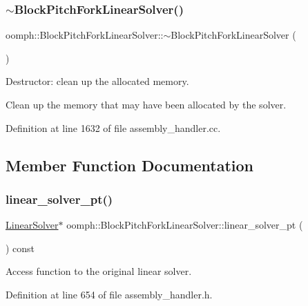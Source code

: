 \subsubsection{\texorpdfstring{$\sim$\+Block\+Pitch\+Fork\+Linear\+Solver()}{~BlockPitchForkLinearSolver()}}
{\footnotesize\ttfamily oomph\+::\+Block\+Pitch\+Fork\+Linear\+Solver\+::$\sim$\+Block\+Pitch\+Fork\+Linear\+Solver (\begin{DoxyParamCaption}{ }\end{DoxyParamCaption})}



Destructor\+: clean up the allocated memory. 

Clean up the memory that may have been allocated by the solver. 

Definition at line 1632 of file assembly\+\_\+handler.\+cc.



\subsection{Member Function Documentation}
\mbox{\label{classoomph_1_1BlockPitchForkLinearSolver_a38efead8e84202a3232b4a3624a2986c}} 
\subsubsection{\texorpdfstring{linear\+\_\+solver\+\_\+pt()}{linear\_solver\_pt()}}
{\footnotesize\ttfamily \hyperlink{classoomph_1_1LinearSolver}{Linear\+Solver}$\ast$ oomph\+::\+Block\+Pitch\+Fork\+Linear\+Solver\+::linear\+\_\+solver\+\_\+pt (\begin{DoxyParamCaption}{ }\end{DoxyParamCaption}) const\hspace{0.3cm}{\ttfamily [inline]}}



Access function to the original linear solver. 



Definition at line 654 of file assembly\+\_\+handler.\+h.



